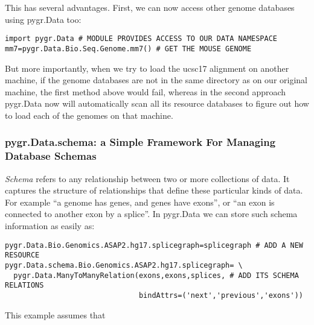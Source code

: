 \documentclass{howto}
\begin{document}
This has several advantages.  First, we can now access other genome databases
using pygr.Data too:
\begin{verbatim}
import pygr.Data # MODULE PROVIDES ACCESS TO OUR DATA NAMESPACE
mm7=pygr.Data.Bio.Seq.Genome.mm7() # GET THE MOUSE GENOME
\end{verbatim}
But more importantly, when we try to load the ucsc17 alignment on
another machine, if the genome databases are not in the same directory
as on our original machine, the first method above would fail, whereas in
the second approach pygr.Data now will automatically scan all its resource databases to
figure out how to load each of the genomes on that machine.

\subsubsection{pygr.Data.schema: a Simple Framework For Managing Database Schemas}
{\em Schema} refers to any relationship between two or more collections of
data.  It captures the structure of relationships that define these particular
kinds of data.  For example ``a genome has genes, and genes have exons'', or 
``an exon is connected to another exon by a splice''.  In pygr.Data we can
store such schema information as easily as:
\begin{verbatim}
pygr.Data.Bio.Genomics.ASAP2.hg17.splicegraph=splicegraph # ADD A NEW RESOURCE
pygr.Data.schema.Bio.Genomics.ASAP2.hg17.splicegraph= \
  pygr.Data.ManyToManyRelation(exons,exons,splices, # ADD ITS SCHEMA RELATIONS
                               bindAttrs=('next','previous','exons'))
\end{verbatim}
This example assumes that 
\end{document}
